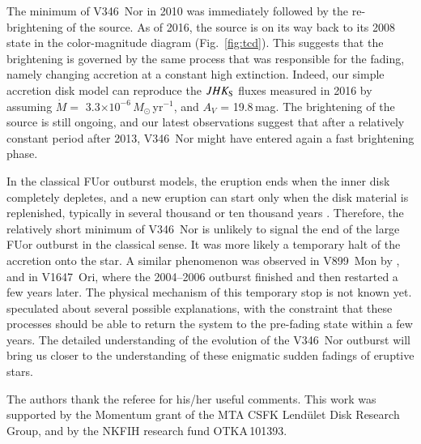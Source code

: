 \documentclass{aa}
\begin{document}
The minimum of V346~Nor in 2010 was immediately followed by the
re-brightening of the source. As of 2016, the source is on its way
back to its 2008 state in the color-magnitude diagram
(Fig.~\ref{fig:tcd}). This suggests that the brightening is governed
by the same process that was responsible for the fading, namely
changing accretion at a constant high extinction. Indeed, our simple
accretion disk model can reproduce the $JHK_{\rm S}$ fluxes measured
in 2016 by assuming $\dot{M} =$
3.3$\times10^{-6}\,M_{\odot}$\,yr$^{-1}$, and $A_V$ = 19.8\,mag. The
brightening of the source is still ongoing, and our latest
observations suggest that after a relatively constant period after
2013, V346~Nor might have entered again a fast brightening phase.

In the classical FUor outburst models, the eruption ends when the
inner disk completely depletes, and a new eruption can start only when
the disk material is replenished, typically in several thousand or ten
thousand years \citep{bell1994}. Therefore, the relatively short
minimum of V346~Nor is unlikely to signal the end of the large FUor
outburst in the classical sense. It was more likely a temporary halt
of the accretion onto the star. A similar phenomenon was observed in
V899~Mon by \citet{ninan2015}, and in V1647~Ori, where the 2004--2006
outburst finished and then restarted a few years later. The physical
mechanism of this temporary stop is not known yet. \citet{ninan2015}
speculated about several possible explanations, with the constraint
that these processes should be able to return the system to the
pre-fading state within a few years. The detailed understanding of the
evolution of the V346~Nor outburst will bring us closer to the
understanding of these enigmatic sudden fadings of eruptive stars.

\begin{acknowledgements}The authors thank the referee for his/her
  useful comments. This work was supported by the Momentum grant of
  the MTA CSFK Lend\"ulet Disk Research Group, and by the NKFIH
  research fund OTKA\,101393.
\end{acknowledgements}


\end{document}
